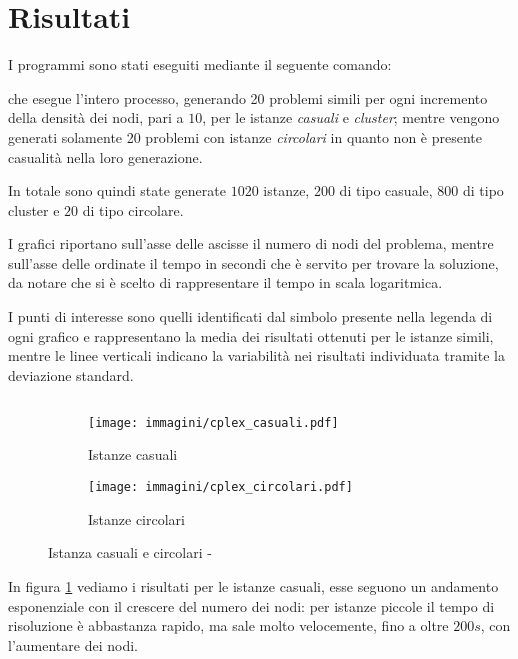 \section{Risultati}
\label{sec:risultati}
I programmi sono stati eseguiti mediante il seguente comando:
\begin{quotation}
\end{quotation}
che esegue l'intero processo, generando 20 problemi simili per ogni incremento della densità dei nodi, pari a $10$, per le istanze \emph{casuali} e \emph{cluster}; mentre vengono generati solamente 20 problemi con istanze \emph{circolari} in quanto non è presente casualità nella loro generazione.

In totale sono quindi state generate $1020$ istanze, $200$ di tipo casuale, $800$ di tipo cluster e $20$ di tipo circolare.

I grafici riportano sull'asse delle ascisse il numero di nodi del problema, mentre sull'asse delle ordinate il tempo in secondi che è servito per trovare la soluzione, da notare che si è scelto di rappresentare il tempo in scala logaritmica.

I punti di interesse sono quelli identificati dal simbolo presente nella legenda di ogni grafico e rappresentano la media dei risultati ottenuti per le istanze simili, mentre le linee verticali indicano la variabilità nei risultati individuata tramite la deviazione standard.

\subsection{}

\begin{figure}[htb]
	\centering
	\begin{subfigure}[b]{.45\textwidth}
		\texttt{[image: immagini/cplex\_casuali.pdf]}
		\caption{Istanze casuali}
		\label{fig:casuali cplex}
	\end{subfigure}
	\quad
	\begin{subfigure}[b]{.45\textwidth}
		\texttt{[image: immagini/cplex\_circolari.pdf]}
		\caption{Istanze circolari}
		\label{fig:circolari cplex}
	\end{subfigure}
	\caption{Istanza casuali e circolari - }
	\label{fig:casuali circolari cplex}
\end{figure}

In figura \ref{fig:casuali cplex} vediamo i risultati per le istanze casuali, esse seguono un andamento esponenziale con il crescere del numero dei nodi: per istanze piccole il tempo di risoluzione è abbastanza rapido, ma sale molto velocemente, fino a oltre $200s$, con l'aumentare dei nodi.

